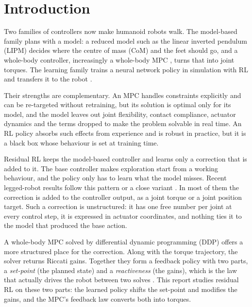 \documentclass[conference]{IEEEtran}
\begin{document}
\section{Introduction}

Two families of controllers now make humanoid robots walk.
The model-based family plans with a model: a reduced model such as the linear inverted pendulum (LIPM) \cite{kajita2001lipm,kajita2003preview} decides where the centre of mass (CoM) and the feet should go, and a whole-body controller, increasingly a whole-body MPC \cite{tassa2012synthesis,mastalli2020crocoddyl,dantec2022wbmpc}, turns that into joint torques.
The learning family trains a neural network policy in simulation with RL and transfers it to the robot \cite{hwangbo2019learning,lee2020learning,rudin2022minutes,radosavovic2024humanoid}.

Their strengths are complementary.
An MPC handles constraints explicitly and can be re-targeted without retraining, but its solution is optimal only for its model, and the model leaves out joint flexibility, contact compliance, actuator dynamics and the terms dropped to make the problem solvable in real time.
An RL policy absorbs such effects from experience and is robust in practice, but it is a black box whose behaviour is set at training time.

Residual RL \cite{silver2018residual,johannink2019residual} keeps the model-based controller and learns only a correction that is added to it.
The base controller makes exploration start from a working behaviour, and the policy only has to learn what the model misses.
Recent legged-robot results follow this pattern or a close variant \cite{gangapurwala2022rloc,kang2023rlmodel,jenelten2024dtc,cheng2025rambo,jeon2025residualmpc}.
In most of them the correction is added to the controller output, as a joint torque or a joint position target.
Such a correction is unstructured: it has one free number per joint at every control step, it is expressed in actuator coordinates, and nothing ties it to the model that produced the base action.

A whole-body MPC solved by differential dynamic programming (DDP) \cite{mayne1966ddp} offers a more structured place for the correction.
Along with the torque trajectory, the solver returns Riccati gains.
Together they form a feedback policy with two parts, a \emph{set-point} (the planned state) and a \emph{reactiveness} (the gains), which is the law that actually drives the robot between two solves \cite{grandia2019feedback,dantec2022firstorder,dantec2022wbmpc}.
This report studies residual RL on these two parts: the learned policy shifts the set-point and modifies the gains, and the MPC's feedback law converts both into torques.
\end{document}
